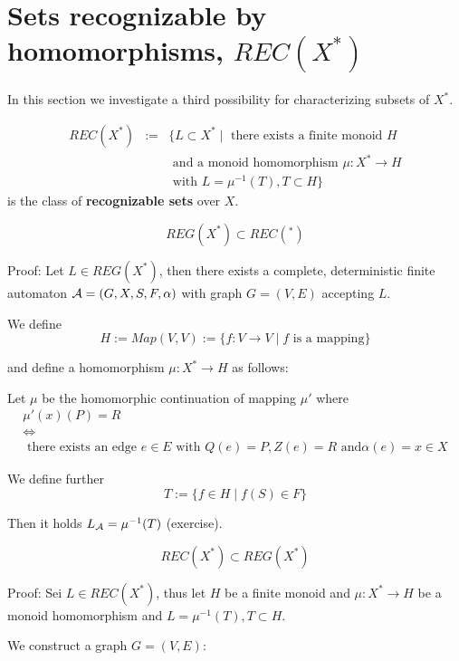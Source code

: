 \section{Sets recognizable by homomorphisms, $REC(X^*)$}

In this section we investigate a third possibility for characterizing subsets of
$X^*$.

\begin{definition}
\begin{eqnarray*}
 REC(X^*) & := & \{ L \subset X^* \mid \mbox{ there exists a
finite monoid } H \\
& & \mbox{ and a monoid homomorphism }\mu : X^* \to H \\
& & \mbox{ with } L = \mu^{-1}(T), T \subset H \}
\end{eqnarray*}
is the class of {\bf recognizable sets} over $X$.
\end{definition}

\begin{lemma}
\[ REG(X^*) \subset REC(^*) \]
\end{lemma}

Proof: Let $L \in REG(X^*)$, then there exists a complete, deterministic finite
automaton $\mbox{$\mathcal{A}$} = (G, X, S, F, \alpha)$ with graph $G = (V, E)$ accepting $L$.

We define \[ H := Map(V,V) := \{ f : V \to V \mid f \mbox{ is a mapping} \} \]

and define a homomorphism $\mu : X^* \to H$ as follows:

Let $\mu$ be the homomorphic continuation of mapping $\mu'$ where
\begin{eqnarray*}
& \mu'(x)(P) = R & \\
& \Leftrightarrow & \\
& \mbox{ there exists an edge }e \in E\mbox{ with }Q(e) = P, Z(e) = R\mbox{ and
}\alpha(e) = x \in X &
\end{eqnarray*}

We define further \[ T := \{ f \in H \mid f(S) \in F \} \]

Then it holds $\mbox{$L_{\mathcal{A}}$} = \mu^{-1}(T)$ (exercise).

\begin{lemma}
\[ REC(X^*) \subset REG(X^*) \]
\end{lemma}

Proof: Sei $L \in REC(X^*)$, thus let $H$ be a finite monoid and $\mu : X^* \to
H$ be a monoid homomorphism and $L = \mu^{-1}(T), T \subset H$.

We construct a graph $G = (V, E)$:

